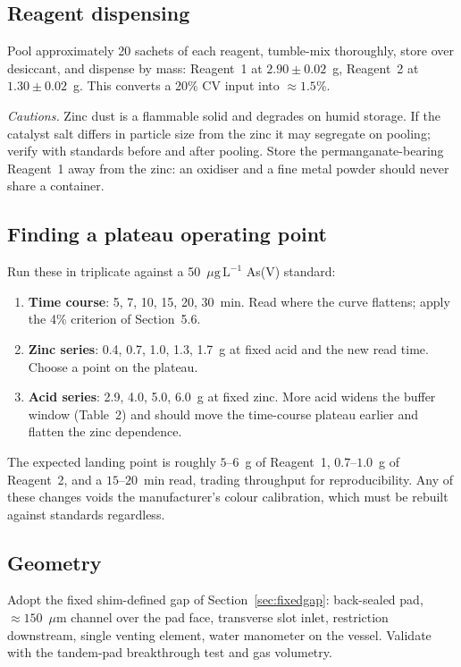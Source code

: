 \documentclass[11pt,a4paper]{article}
\newcommand{\ptl}{\ensuremath{\mu\mathrm{g\,L^{-1}}}}
\newcommand{\um}{\ensuremath{\mu\mathrm{m}}}
\begin{document}
\subsection{Reagent dispensing}

Pool approximately 20 sachets of each reagent, tumble-mix thoroughly, store
over desiccant, and dispense by mass: Reagent~1 at $2.90 \pm 0.02$~g,
Reagent~2 at $1.30 \pm 0.02$~g. This converts a 20\% CV input into
$\approx 1.5$\%.

\emph{Cautions.} Zinc dust is a flammable solid and degrades on humid
storage. If the catalyst salt differs in particle size from the zinc it may
segregate on pooling; verify with standards before and after pooling. Store
the permanganate-bearing Reagent~1 away from the zinc: an oxidiser and a
fine metal powder should never share a container.

\subsection{Finding a plateau operating point}

Run these in triplicate against a 50~\ptl{} As(V) standard:
\begin{enumerate}[nosep]
  \item \textbf{Time course}: 5, 7, 10, 15, 20, 30~min. Read where the
        curve flattens; apply the 4\% criterion of Section~5.6.
  \item \textbf{Zinc series}: 0.4, 0.7, 1.0, 1.3, 1.7~g at fixed acid and
        the new read time. Choose a point on the plateau.
  \item \textbf{Acid series}: 2.9, 4.0, 5.0, 6.0~g at fixed zinc. More acid
        widens the buffer window (Table~2) and should move the time-course
        plateau earlier and flatten the zinc dependence.
\end{enumerate}
The expected landing point is roughly $5$--$6$~g of Reagent~1,
$0.7$--$1.0$~g of Reagent~2, and a $15$--$20$~min read, trading throughput
for reproducibility. Any of these changes voids the manufacturer's colour
calibration, which must be rebuilt against standards regardless.

\subsection{Geometry}

Adopt the fixed shim-defined gap of Section~\ref{sec:fixedgap}:
back-sealed pad, $\approx 150$~\um{} channel over the pad face, transverse
slot inlet, restriction downstream, single venting element, water manometer
on the vessel. Validate with the tandem-pad breakthrough test and gas
volumetry.
\end{document}
